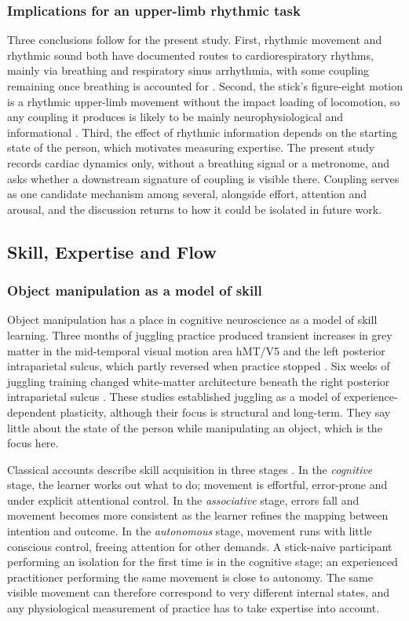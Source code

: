 \subsubsection{Implications for an upper-limb rhythmic task}

Three conclusions follow for the present study. First, rhythmic movement and rhythmic sound both have documented routes to cardiorespiratory rhythms, mainly via breathing and respiratory sinus arrhythmia, with some coupling remaining once breathing is accounted for \citep{ruizblais2020}. Second, the stick's figure-eight motion is a rhythmic upper-limb movement without the impact loading of locomotion, so any coupling it produces is likely to be mainly neurophysiological and informational \citep{bardy2015}. Third, the effect of rhythmic information depends on the starting state of the person, which motivates measuring expertise. The present study records cardiac dynamics only, without a breathing signal or a metronome, and asks whether a downstream signature of coupling is visible there. Coupling serves as one candidate mechanism among several, alongside effort, attention and arousal, and the discussion returns to how it could be isolated in future work.

\subsection{Skill, Expertise and Flow}
\label{sec:bg-skill}

\subsubsection{Object manipulation as a model of skill}

Object manipulation has a place in cognitive neuroscience as a model of skill learning. Three months of juggling practice produced transient increases in grey matter in the mid-temporal visual motion area hMT/V5 and the left posterior intraparietal sulcus, which partly reversed when practice stopped \citep{draganski2004}. Six weeks of juggling training changed white-matter architecture beneath the right posterior intraparietal sulcus \citep{scholz2009}. These studies established juggling as a model of experience-dependent plasticity, although their focus is structural and long-term. They say little about the state of the person while manipulating an object, which is the focus here.

Classical accounts describe skill acquisition in three stages \citep{fitts1967}. In the \emph{cognitive} stage, the learner works out what to do; movement is effortful, error-prone and under explicit attentional control. In the \emph{associative} stage, errors fall and movement becomes more consistent as the learner refines the mapping between intention and outcome. In the \emph{autonomous} stage, movement runs with little conscious control, freeing attention for other demands. A stick-naive participant performing an isolation for the first time is in the cognitive stage; an experienced practitioner performing the same movement is close to autonomy. The same visible movement can therefore correspond to very different internal states, and any physiological measurement of practice has to take expertise into account.

